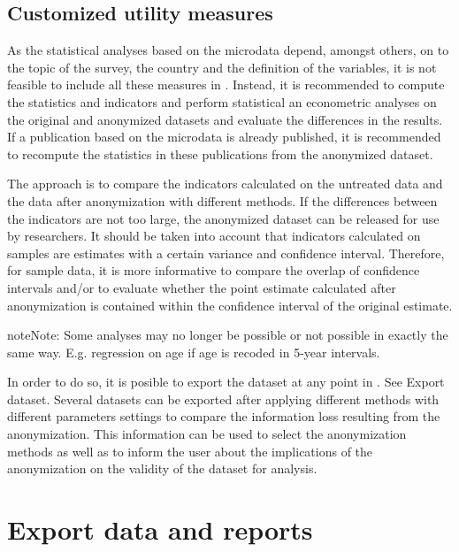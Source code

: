 \documentclass[letterpaper,10pt,english]{sphinxmanual}
\begin{document}
\section{Customized utility measures}
\label{\detokenize{utility:customized-utility-measures}}
As the statistical analyses based on the microdata depend, amongst others,
on to the topic of the survey, the country and the definition of the variables,
it is not feasible to include all these measures in . Instead, it is recommended
to compute the statistics and indicators and perform statistical an econometric
analyses on the original and anonymized datasets and evaluate the differences in the results.
If a publication based on the microdata is already published, it is recommended
to recompute the statistics in these publications from the anonymized dataset.

The approach is to compare the indicators calculated on the untreated data and the
data after anonymization with different methods. If the differences between the
indicators are not too large, the anonymized dataset can be released for use by
researchers. It should be taken into account that indicators calculated on samples
are estimates with a certain variance and confidence interval. Therefore, for sample
data, it is more informative to compare the overlap of confidence intervals and/or
to evaluate whether the point estimate calculated after anonymization is contained
within the confidence interval of the original estimate.

\begin{sphinxadmonition}{note}{Note:}
Some analyses may no longer be possible or not possible in exactly the same way.
E.g. regression on age if age is recoded in 5-year intervals.
\end{sphinxadmonition}

In order to do so, it is posible to export the dataset at any point in .
See Export dataset. Several datasets can be exported after applying different methods
with different parameters settings to compare the information loss resulting from
the anonymization. This information can be used to select the anonymization methods
as well as to inform the user about the implications of the anonymization on
the validity of the dataset for analysis.


\chapter{Export data and reports}
\label{\detokenize{export::doc}}\label{\detokenize{export:export-data-and-reports}}
\end{document}
